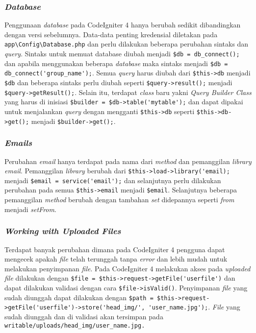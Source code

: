 \subsubsection{\textit{Database}}

Penggunaan \textit{database} pada CodeIgniter 4 hanya berubah sedikit dibandingkan dengan versi sebelumnya. Data-data penting kredensial diletakan pada \verb|app\Config\Database.php| dan perlu dilakukan beberapa perubahan sintaks dan \textit{query}. Sintaks untuk memuat database diubah menjadi \verb|$db = db_connect();| dan  apabila menggunakan beberapa \textit{database} maka sintaks menjadi \verb|$db = db_connect('group_name');|. Semua \textit{query} harus diubah dari \verb|$this->db| menjadi \verb|$db| dan beberapa sintaks perlu diubah seperti \verb|$query->result();| menjadi \verb|$query->getResult();|. Selain itu, terdapat \textit{class} baru yakni \textit{Query Builder Class} yang harus di inisiasi \verb|$builder = $db->table('mytable');| dan dapat dipakai untuk menjalankan \textit{query} dengan mengganti \verb|$this->db| seperti \verb|$this->db->get();| menjadi \verb|$builder->get();|.

\subsubsection{\textit{Emails}}

Perubahan \textit{email} hanya terdapat pada nama dari \textit{method} dan pemanggilan \textit{library email}. Pemanggilan  \textit{library} berubah dari \verb|$this->load->library('email);| menjadi \verb|$email = service('email');| dan selanjutnya perlu dilakukan perubahan pada semua \verb|$this->email| menjadi \verb|$email|. Selanjutnya beberapa pemanggilan \textit{method} berubah dengan tambahan \textit{set} didepannya seperti \textit{from} menjadi \textit{setFrom}.

\subsubsection{\textit{Working with Uploaded Files}}

Terdapat banyak perubahan dimana pada CodeIgniter 4 pengguna dapat mengecek apakah \textit{file} telah terunggah tanpa \textit{error} dan lebih mudah untuk melakukan penyimpanan \textit{file}. Pada CodeIgniter 4 melakukan akses pada \textit{uploaded file} dilakukan dengan \verb|$file = $this->request->getFile('userfile')| dan dapat dilakukan validasi dengan cara \verb|$file->isValid()|. Penyimpanan \textit{file} yang sudah diunggah dapat dilakukan dengan \verb|$path = $this->request->getFile('userfile')->store('head_img/', 'user_name.jpg');|. \textit{File} yang sudah diunggah dan di validasi akan tersimpan pada \verb|writable/uploads/head_img/user_name.jpg.|

